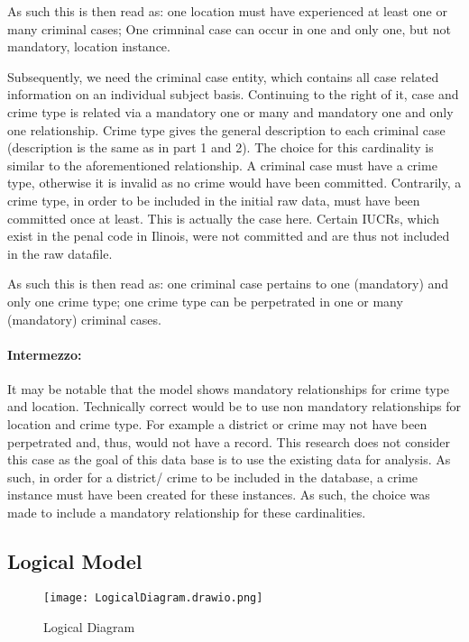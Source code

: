 \documentclass[a4paper]{article}
\begin{document}
\indent As such this is then read as: one location must have experienced at least one or many criminal cases; One crimninal case can occur in one and only one, but not mandatory, location instance.

\indent Subsequently, we need the criminal case entity, which contains all case related information on an individual subject basis. Continuing to the right of it, case and crime type is related via a mandatory one or many and mandatory one and only one relationship. Crime type gives the general description to each criminal case (description is the same as in part 1 and 2). The choice for this cardinality is similar to the aforementioned relationship. A criminal case must have a crime type, otherwise it is invalid as no crime would have been committed. Contrarily, a crime type, in order to be included in the initial raw data, must have been committed once at least. This is actually the case here. Certain IUCRs, which exist in the penal code in Ilinois, were not committed and are thus not included in the raw datafile.

\indent As such this is then read as: one criminal case pertains to one (mandatory) and only one crime type; one crime type can be perpetrated in one or many (mandatory) criminal cases.


\paragraph{Intermezzo:} It may be notable that the model shows mandatory relationships for crime type and location. Technically correct would be to use non mandatory relationships for location and crime type. For example a district or crime may not have been perpetrated and, thus, would not have a record. This research does not consider this case as the goal of this data base is to use the existing data for analysis. As such, in order for a district/ crime to be included in the database, a crime instance must have been created for these instances. As such, the choice was made to include a mandatory relationship for these cardinalities.

\subsection{Logical Model}


\begin{figure}[htp]
		\centering
		\texttt{[image: LogicalDiagram.drawio.png]}
         \small
         \caption{Logical Diagram}
\end{figure}
\end{document}
